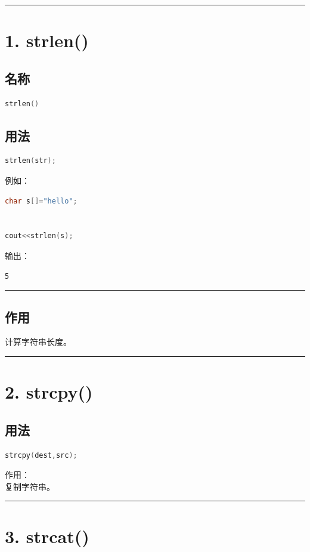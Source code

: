 \documentclass[9pt,twocolumn]{extarticle}
\begin{document}
\noindent\rule{\linewidth}{0.4pt}

\section{1. strlen()}

\subsection{名称}
\begin{lstlisting}[language=C++]
strlen()
\end{lstlisting}

\subsection{用法}
\begin{lstlisting}[language=C++]
strlen(str);
\end{lstlisting}
例如：
\begin{lstlisting}[language=C++]
char s[]="hello";


cout<<strlen(s);
\end{lstlisting}
输出：
\begin{lstlisting}
5
\end{lstlisting}

\noindent\rule{\linewidth}{0.4pt}

\subsection{作用}
计算字符串长度。

\noindent\rule{\linewidth}{0.4pt}

\section{2. strcpy()}

\subsection{用法}
\begin{lstlisting}[language=C++]
strcpy(dest,src);
\end{lstlisting}
作用：\\
复制字符串。

\noindent\rule{\linewidth}{0.4pt}

\section{3. strcat()}
\end{document}
